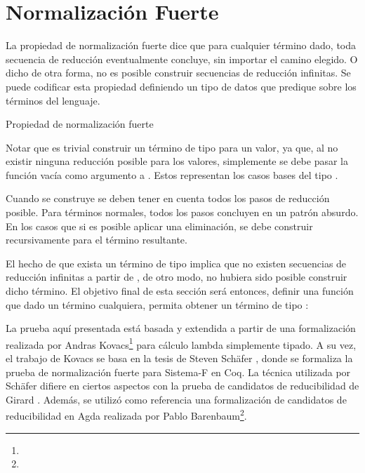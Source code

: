 \section{Normalización Fuerte}

La propiedad de normalización fuerte dice que para cualquier término dado, toda secuencia de reducción eventualmente concluye, sin importar el camino elegido.
O dicho de otra forma, no es posible construir secuencias de reducción infinitas.
Se puede codificar esta propiedad definiendo un tipo de datos que predique sobre los términos del lenguaje.

\begin{codigo}
	Propiedad de normalización fuerte
\end{codigo}

Notar que es trivial construir un término de tipo  para un valor, ya que, al no existir ninguna reducción posible para los valores, simplemente se debe pasar la función vacía como argumento a .
Estos representan los casos bases del tipo .

\begin{example}
	Cuando se construye  se deben tener en cuenta todos los pasos de reducción posible.
	Para términos normales, todos los pasos concluyen en un patrón absurdo.
	En los casos que si es posible aplicar una eliminación, se debe construir recursivamente  para el término resultante.
	
\end{example}

El hecho de que exista un término de tipo   implica que no existen secuencias de reducción infinitas a partir de , de otro modo, no hubiera sido posible construir dicho término.
El objetivo final de esta sección será entonces, definir una función que dado un término cualquiera, permita obtener un término de tipo  :

\vspace{0.5em}
\AgdaSymbol{:}
\AgdaSymbol{\{}
\AgdaSymbol{\}}
\AgdaSymbol{(}
\AgdaSymbol{:}
\AgdaSymbol{)}
\vspace{0.5em}

La prueba aquí presentada está basada y extendida a partir de una formalización realizada por 
Andras Kovacs\footnote{} para cálculo lambda simplemente tipado.
A su vez, el trabajo de Kovacs se basa en la tesis de Steven Schäfer \cite{Schafer}, donde se formaliza la prueba de normalización fuerte para Sistema-F en Coq.
La técnica utilizada por Schäfer difiere en ciertos aspectos con la prueba de candidatos de reducibilidad de Girard \cite{Girard}.
Además, se utilizó como referencia una formalización de candidatos de reducibilidad en Agda realizada por Pablo Barenbaum\footnote{}.

